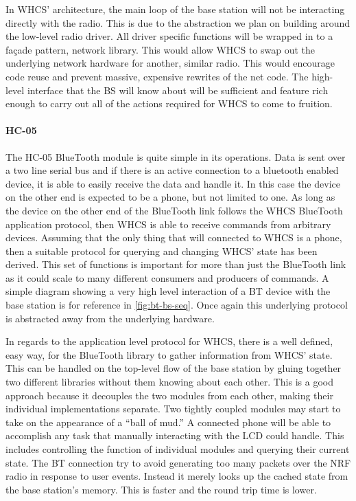 In WHCS' architecture, the main loop of the base station will not be
interacting directly with the radio. This is due to the abstraction we plan on
building around the low-level radio driver. All driver specific functions will
be wrapped in to a fa\c{c}ade pattern, network library. This would allow WHCS
to swap out the underlying network hardware for another, similar radio. This
would encourage code reuse and prevent massive, expensive rewrites of the
net code. The high-level interface that the BS will know about will be
sufficient and feature rich enough to carry out all of the actions required for
WHCS to come to fruition.

\paragraph{HC-05}
The HC-05 BlueTooth module is quite simple in its operations. Data is sent over
a two line serial bus and if there is an active connection to a bluetooth
enabled device, it is able to easily receive the data and handle it. In
this case the device on the other end is expected to be a phone, but not
limited to one. As long as the device on the other end of the BlueTooth link
follows the WHCS BlueTooth application protocol, then WHCS is able to
receive commands from arbitrary devices. Assuming that the only thing that will
connected to WHCS is a phone, then a suitable protocol for querying and
changing WHCS' state has been derived. This set of functions is
important for more than just the BlueTooth link as it
could scale to many different consumers and producers of commands. A simple
diagram showing a very high level interaction of a BT device with the base
station is for reference in \autoref{fig:bt-bs-seq}. Once again
this underlying protocol is abstracted away from the underlying
hardware. 


In regards to the application level protocol for WHCS, there is a
well defined, easy way, for the BlueTooth library to gather information from
WHCS' state. This can be handled on the top-level flow of the base station by
gluing together two different libraries without them knowing about each other.
This is a good approach because it decouples the two modules from each
other, making their individual implementations separate. Two tightly coupled
modules may start to take on the appearance of a ``ball of mud.'' A connected
phone will be able to accomplish any task that manually interacting with the
LCD could handle. This includes controlling the function of individual
modules and querying their current state. The BT connection try to avoid
generating too many packets over the NRF radio in response to user events.
Instead it  merely looks up the cached state from the base station's memory.
This is faster and the round trip time is lower.

